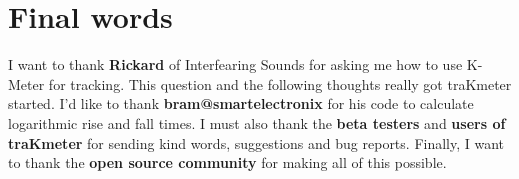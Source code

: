 










\chapter{Final words}
\label{chap:final_words}

I want to thank \textbf{Rickard} of Interfearing Sounds for asking me
how to use K-Meter for tracking.  This question and the following
thoughts really got traKmeter started.  I'd like to thank
\textbf{bram@smartelectronix} for his code to calculate logarithmic
rise and fall times.  I must also thank the \textbf{beta testers} and
\textbf{users of traKmeter} for sending kind words, suggestions and
bug reports.  Finally, I want to thank the \textbf{open source
  community} for making all of this possible.

